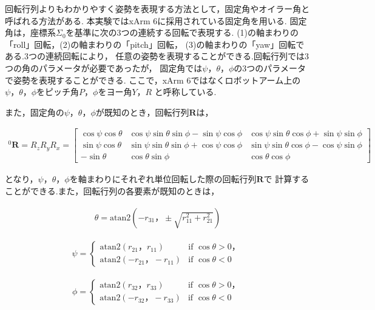 回転行列よりもわかりやすく姿勢を表現する方法として，固定角やオイラー角と呼ばれる方法がある.
本実験ではxArm 6に採用されている固定角を用いる.
固定角は，座標系$\Sigma_0$を基準に次の3つの連続する回転で表現する.
(1)の軸まわりの「roll」回転，(2)の軸まわりの「pitch」回転，
(3)の軸まわりの「yaw」回転である.3つの連続回転により，
任意の姿勢を表現することができる.回転行列では3つの角のパラメータが必要であったが，
固定角では$\psi， \theta， \phi$の3つのパラメータで姿勢を表現することができる.
ここで，xArm 6ではなくロボットアーム上の$\psi， \theta， \phi$をピッチ角$P， \phi$をヨー角$Y， R$
と呼称している.

また，固定角の$\psi， \theta， \phi$が既知のとき，回転行列$\mathbf{R}$は，

\begin{align}
  ^0\mathbf{R} = R_z R_y R_x = 
  \begin{bmatrix} 
    \cos \psi \cos \theta & \cos \psi \sin \theta \sin \phi - \sin \psi \cos \phi & \cos \psi \sin \theta \cos \phi + \sin \psi \sin \phi \\ 
    \sin \psi \cos \theta & \sin \psi \sin \theta \sin \phi + \cos \psi \cos \phi & \sin \psi \sin \theta \cos \phi - \cos \psi \sin \phi \\ 
    - \sin \theta         & \cos \theta \sin \phi                                 & \cos \theta \cos \phi 
  \end{bmatrix} \tag{2.17}
\end{align}

となり，$\psi， \theta， \phi$を軸まわりにそれぞれ単位回転した際の回転行列$\mathbf{R}$で
計算することができる.また，回転行列の各要素が既知のときは，

\begin{align}
  \theta = \text{atan2} \left( -r_{31}， \pm \sqrt{r_{11}^2 + r_{21}^2} \right) \tag{2.18}
\end{align}

\begin{align}
  \psi = 
  \begin{cases}
    \text{atan2}(r_{21}， r_{11})   & \text{if } \cos \theta > 0， \\
    \text{atan2}(-r_{21}， -r_{11}) & \text{if } \cos \theta < 0
  \end{cases} \tag{2.19}
\end{align}

\begin{align}
  \phi = 
  \begin{cases}
    \text{atan2}(r_{32}， r_{33})   & \text{if } \cos \theta > 0， \\
    \text{atan2}(-r_{32}， -r_{33}) & \text{if } \cos \theta < 0
  \end{cases} \tag{2.20}
\end{align}

